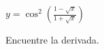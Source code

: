 \item $\displaystyle y = \cos^2 \left( \frac{1 - \sqrt{x}}{1 + \sqrt{x}} \right)$
\par
Encuentre la derivada.
